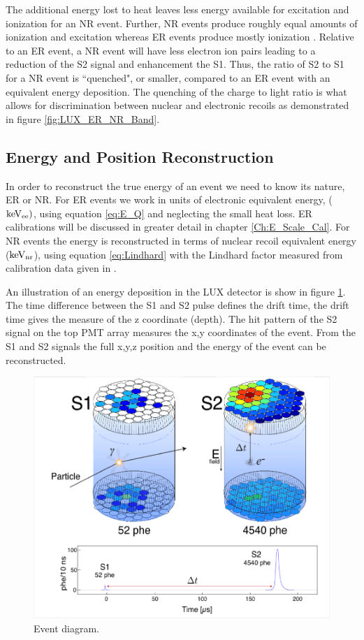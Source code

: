 \noindent The additional energy lost to heat leaves less energy available for excitation and ionization for an NR event. Further, NR events produce roughly equal amounts of ionization and excitation whereas ER events produce mostly ionization \cite{FanoTheoretical}  \cite{Dahl_Thesis}. Relative to an ER event, a NR event will have less electron ion pairs leading to a reduction of the S2 signal and enhancement the S1. Thus, the ratio of S2 to S1 for a NR event is ``quenched", or smaller, compared to an ER event with an equivalent energy deposition. The quenching of the charge to light ratio is what allows for discrimination between nuclear and electronic recoils as demonstrated in figure \ref{fig:LUX_ER_NR_Band}.

\subsection{Energy and Position Reconstruction}
In order to reconstruct the true energy of an event we need to know its nature, ER or NR. For ER events we work in units of electronic equivalent energy, ($\rm keV_{ee})$, using equation \ref{eq:E_Q} and neglecting the small heat loss. ER calibrations will be discussed in greater detail in chapter \ref{Ch:E_Scale_Cal}. For NR events the energy is reconstructed in terms of nuclear recoil equivalent energy ($\rm keV_{nr}$), using equation \ref{eq:Lindhard} with the Lindhard factor measured from calibration data given in \cite{NEST} \cite{NEST_2013}.  

An illustration of an energy deposition in the LUX detector is show in figure \ref{fig:LUX_Event}. The time difference between the S1 and S2 pulse defines the drift time, the drift time gives the measure of the z coordinate (depth). The hit pattern of the S2 signal on the top PMT array measures the x,y coordinates of the event. From the S1 and S2 signals the full x,y,z position and the energy of the event can be reconstructed.

 \begin{figure}[h!]\centering
\includegraphics[width=150mm]{Chapter_LUX_Det/LUX_Event_Diagram.png}
\caption{Event diagram.}
\label{fig:LUX_Event}
\end{figure}

